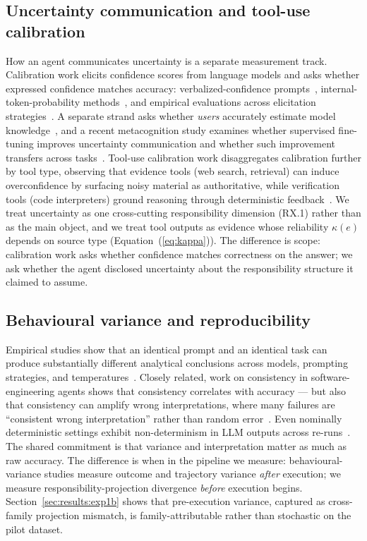 \subsection{Uncertainty communication and tool-use calibration}
\label{sec:related:calibration}

How an agent communicates uncertainty is a separate measurement track. Calibration work elicits confidence scores from language models and asks whether expressed confidence matches accuracy: verbalized-confidence prompts~\cite{tian2023justask, lin2022teaching}, internal-token-probability methods~\cite{kadavath2022mostlyknow}, and empirical evaluations across elicitation strategies~\cite{xiong2024canllms}. A separate strand asks whether \emph{users} accurately estimate model knowledge~\cite{steyvers2025whatpeoplethinkknow}, and a recent metacognition study examines whether supervised fine-tuning improves uncertainty communication and whether such improvement transfers across tasks~\cite{metacog2024}. Tool-use calibration work disaggregates calibration further by tool type, observing that evidence tools (web search, retrieval) can induce overconfidence by surfacing noisy material as authoritative, while verification tools (code interpreters) ground reasoning through deterministic feedback~\cite{confidencedichotomy2024}. We treat uncertainty as one cross-cutting responsibility dimension (RX.1) rather than as the main object, and we treat tool outputs as evidence whose reliability $\kappa(e)$ depends on source type (Equation~(\ref{eq:kappa})). The difference is scope: calibration work asks whether confidence matches correctness on the answer; we ask whether the agent disclosed uncertainty about the responsibility structure it claimed to assume.

\subsection{Behavioural variance and reproducibility}
\label{sec:related:variance}

Empirical studies show that an identical prompt and an identical task can produce substantially different analytical conclusions across models, prompting strategies, and temperatures~\cite{sameprompt2024}. Closely related, work on consistency in software-engineering agents shows that consistency correlates with accuracy --- but also that consistency can amplify wrong interpretations, where many failures are ``consistent wrong interpretation'' rather than random error~\cite{consistency2024}. Even nominally deterministic settings exhibit non-determinism in LLM outputs across re-runs~\cite{atkinson2024nondeterminism}. The shared commitment is that variance and interpretation matter as much as raw accuracy. The difference is when in the pipeline we measure: behavioural-variance studies measure outcome and trajectory variance \emph{after} execution; we measure responsibility-projection divergence \emph{before} execution begins. Section~\ref{sec:results:exp1b} shows that pre-execution variance, captured as cross-family projection mismatch, is family-attributable rather than stochastic on the pilot dataset.

